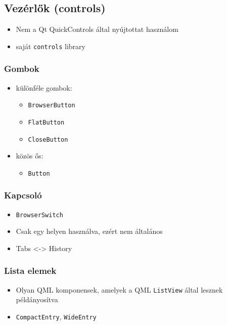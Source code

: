 \documentclass[12pt]{report}
\begin{document}
\subsection{Vezérlők (controls)}
\begin{itemize}
    \item Nem a Qt QuickControls által nyújtottat használom
    \item saját \texttt{controls} library
\end{itemize}

\subsubsection{Gombok}
\begin{itemize}
    \item különféle gombok:
        \begin{itemize}
            \item \texttt{BrowserButton}
            \item \texttt{FlatButton}
            \item \texttt{CloseButton}
        \end{itemize}
    \item közös ős:
        \begin{itemize}
            \item \texttt{Button}
        \end{itemize}
\end{itemize}

\subsubsection{Kapcsoló}
\begin{itemize}
    \item \texttt{BrowserSwitch}
    \item Csak egy helyen használva, ezért nem általános
    \item Tabs <-> History
\end{itemize}

\subsubsection{Lista elemek}
\begin{itemize}
    \item Olyan QML komponensek, amelyek a QML \texttt{ListView} által lesznek példányosítva

    \item \texttt{CompactEntry}, \texttt{WideEntry}
\end{itemize}
\end{document}
